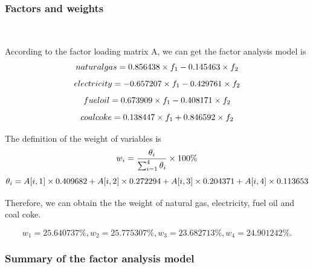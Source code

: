 \documentclass[a4paper,11pt]{article}
\begin{document}
\subsubsection{Factors and weights}
\textrm{\\}
\par According to the factor loading matrix A, we can get the factor analysis model is
\begin{equation}
    \centering
     natural gas=0.856438 \times f_1-0.145463 \times f_2
\end{equation}
\begin{equation}
    \centering
 electricity=-0.657207 \times f_1-0.429761 \times f_2
\end{equation}
\begin{equation}
    \centering
 fuel oil=0.673909 \times f_1-0.408171 \times f_2
\end{equation}
\begin{equation}
    \centering
coal coke=0.138447 \times f_1+0.846592 \times f_2
\end{equation}
\par The definition of the weight of variables is\cite{5}
\begin{equation}
    \centering
w_i=\frac{ \theta_i }{ \sum_{i=1}^{4}\theta_i } \times 100\%
\end{equation}
\begin{equation}
    \centering
\theta_i=A[i,1] \times 0.409682+A[i,2] \times 0.272294+A[i,3] \times 0.204371+A[i,4] \times 0.113653
\end{equation}

\par Therefore, we can obtain the the weight of natural gas, electricity, fuel oil and coal coke.

\[
w_1=25.640737\%, w_2=25.775307\%, w_3=23.682713\%, w_4=24.901242\%.
\]

\subsubsection{Summary of the factor analysis model}
\end{document}
